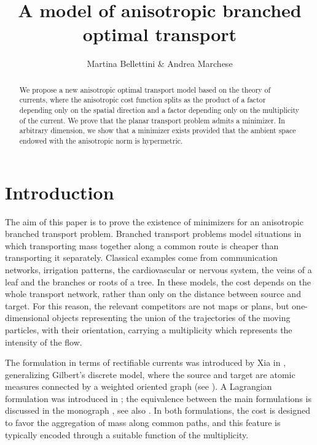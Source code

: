 \documentclass{article}
\title{A model of anisotropic branched optimal transport}
\author{Martina Bellettini \& Andrea Marchese}
\numberwithin{equation}{section}
\theoremstyle{plain}%
\theoremstyle{definition}
\theoremstyle{definition}
\begin{document}
\date{}
\maketitle

\begin{abstract}
    We propose a new anisotropic optimal transport model based on the theory of currents, where the anisotropic cost function splits as the product of a factor depending only on the spatial direction and a factor depending only on the multiplicity of the current. We prove that the planar transport problem admits a minimizer. In arbitrary dimension, we show that a minimizer exists provided that the ambient space endowed with the anisotropic norm is hypermetric.
\end{abstract}

\section{Introduction}
The aim of this paper is to prove the existence of minimizers for an anisotropic branched transport problem. Branched transport problems model situations in which transporting mass together along a common route is cheaper than transporting it separately. Classical examples come from communication networks, irrigation patterns, the cardiovascular or nervous system, the veins of a leaf and the branches or roots of a tree. In these models, the cost depends on the whole transport network, rather than only on the distance between source and target. For this reason, the relevant competitors are not maps or plans, but one-dimensional objects representing the union of the trajectories of the moving particles, with their orientation, carrying a multiplicity which represents the intensity of the flow.

The formulation in terms of rectifiable currents was introduced by Xia in \cite{xia03}, generalizing Gilbert's discrete model, where the source and target are atomic measures connected by a weighted oriented graph (see \cite{gilbert}). A Lagrangian formulation was introduced in \cite{msm}; the equivalence between the main formulations is discussed in the monograph \cite{bcm}, see also \cite{MR3729380}. In both formulations, the cost is designed to favor the aggregation of mass along common paths, and this feature is typically encoded through a suitable function of the multiplicity.
\end{document}
